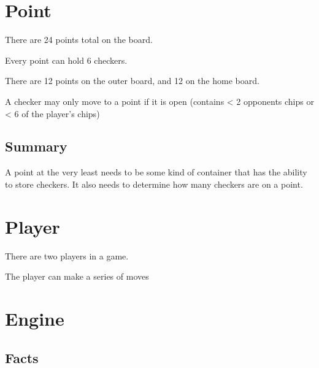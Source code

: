 \documentclass{report}
\begin{document}
\section{Point}

\begin{dashed}
    \item There are 24 points total on the board.
    \item Every point can hold 6 checkers.
    \item There are 12 points on the outer board, and 12 on the home board.
    \item A checker may only move to a point if it is open (contains < 2 opponents chips
        or < 6 of the player's chips)
\end{dashed}

\subsection{Summary}

A point at the very least needs to be some kind of container that has the ability
to store checkers. It also needs to determine how many checkers are on a point.

\section{Player}

\begin{dashed}
    \item There are two players in a game.
    \item The player can make a series of moves
\end{dashed}

\section{Engine}

\subsection{Facts}
\end{document}
